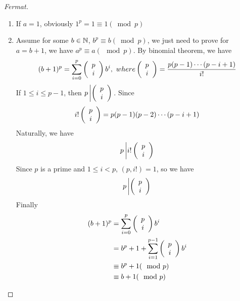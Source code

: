 \documentclass[11pt]{Numbertheory}
\begin{document}
\begin{proof} [Fermat]
    \begin{enumerate}
        \item If $a = 1$, obviously $1^p = 1 \equiv 1(\bmod p)$
        \item Assume for some $b\in \mathbb{N}$, $b^p\equiv b(\bmod p)$,
        we just need to prove for $a = b+1$, we have $a^p\equiv a(\mod p)$. By binomial theorem, we have 
        \[  
        (b+1)^p = \sum_{i=0}^p
        \z( \begin{array}{c}
	p\\
	i\\
        \end{array} \y) 
        b^i, \ 
        where \z( \begin{array}{c}
	p\\
	i\\
        \end{array} \y) = \frac{p(p-1)\cdots(p-i+1)}{i!}
        \]
        If $1\le i \le p-1$, then $p \left |\left( \begin{array}{c}
	p\\
	i\\
        \end{array} \right) \right. $. Since 
        \[  i! \left( \begin{array}{c}p\\i\\\end{array} \right)= p(p-1)(p-2)\cdots(p-i+1)\]
        Naturally, we have 
        \[  p \left |i! \left( \begin{array}{c}p\\i\\\end{array} \right) \right.\]
        Since $p$ is a prime and $1\le i < p$, $(p, i!) = 1$, so we have 
        \[  p \left |\left( \begin{array}{c}p\\i\\\end{array} \right) \right.\]
        Finally
        \begin{align*}
            (b+1)^p &=\sum_{i=0}^p \left(\begin{array}{c}p\\i\\\end{array} \right) b^i\\
                    &= b^p + 1 + \sum_{i=1}^{p-1}  \left(\begin{array}{c}p\\i\\\end{array} \right) b^i\\
                    &\equiv b^p+1(\mod p)\\
                    &\equiv b + 1(\mod p)
        \end{align*}
    \end{enumerate}
\end{proof}
\end{document}
